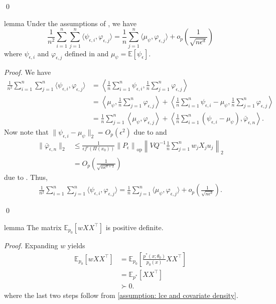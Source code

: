 \documentclass[11pt]{article}
\begin{document}
\qed{}


\begin{restatable}{lemma}{} \label{lemma: inner prod decomp}
    Under the assumptions of , we have 
    \[\frac{1}{n^2} \sum_{i = 1}^n\sum_{j = 1}^n\langle\psi_{ \epsilon, i}, \varphi_{\epsilon, j}\rangle = \frac{1}{n}\sum_{j = 1}^n\langle\mu_{\psi}, \varphi_{\epsilon, j}\rangle + o_p\left(\frac{1}{\sqrt{n\epsilon^d}}\right)\]
    where $\psi_{\epsilon, i}$ and $\varphi_{\epsilon, j}$ defined in  and $\mu_{\psi} = \mathbb{E}[\psi_{\epsilon}]$. 
\end{restatable}
\noindent \textit{Proof.} We have
\begin{align*}
    \frac{1}{n^2} \sum_{i = 1}^n\sum_{j = 1}^n\langle\psi_{ \epsilon, i}, \varphi_{\epsilon, j}\rangle &= \left\langle\frac{1}{n}\sum_{i = 1}^n\psi_{\epsilon, i}, \frac{1}{n}\sum_{j = 1}^n\varphi_{\epsilon, j} \right\rangle \\
    &= \left\langle\mu_\psi, \frac{1}{n}\sum_{j = 1}^n\varphi_{\epsilon, j} \right\rangle + \left\langle\frac{1}{n}\sum_{i = 1}^n\psi_{\epsilon, i} - \mu_{\psi}, \frac{1}{n}\sum_{j = 1}^n\varphi_{\epsilon, j} \right\rangle \\
    &= \frac{1}{n}\sum_{j = 1}^n\left\langle\mu_\psi, \varphi_{\epsilon, j} \right\rangle + \left\langle \frac{1}{n}\sum_{i = 1}^n(\psi_{\epsilon, i} - \mu_{\psi}), \bar{\varphi}_{\epsilon, n} \right\rangle.
\end{align*}
Now note that $\|\psi_{\epsilon, i} - \mu_{\psi}\|_2 = O_p(\epsilon^2)$ due to  and 
\begin{align*}\|\bar\varphi_{\epsilon, n}\|_2 &\leq \frac{1}{\epsilon f'(\Pi(x_0))}\left\|P_{\epsilon}\right\|_{\text{op}}\left\|VQ^{-1}\frac{1}{n} \sum_{j = 1}^n w_jX_ju_j\right\|_2 \\
&= O_p\left(\frac{1}{\sqrt{n\epsilon^{d+2}}}\right)
\end{align*}
due to . Thus,
\begin{align*}
    \frac{1}{n^2} \sum_{i = 1}^n\sum_{j = 1}^n\langle\psi_{ \epsilon, i}, \varphi_{\epsilon, j}\rangle = \frac{1}{n}\sum_{j = 1}^n\langle\mu_{\psi}, \varphi_{\epsilon, j}\rangle + o_p\left(\frac{1}{\sqrt{n\epsilon^d}}\right).
\end{align*}

\qed{}




\begin{restatable}{lemma}{} \label{lemma: pd}
    The matrix $\mathbb{E}_{p_0}[wXX^{\top}]$ is positive definite.
\end{restatable}
\noindent \textit{Proof.} Expanding $w$ yields
\begin{align}
    \mathbb{E}_{p_0}[wXX^{\top}] &= \mathbb{E}_{p_0}\left[\frac{p^*(x;\theta_0)}{p_0(x)}XX^{\top}\right] \\
    &= \mathbb{E}_{p^*}\left[XX^{\top}\right] \\
    &\succ 0.
\end{align}
where the last two steps follow from \cref{assumption: lce and covariate density}.
\end{document}

